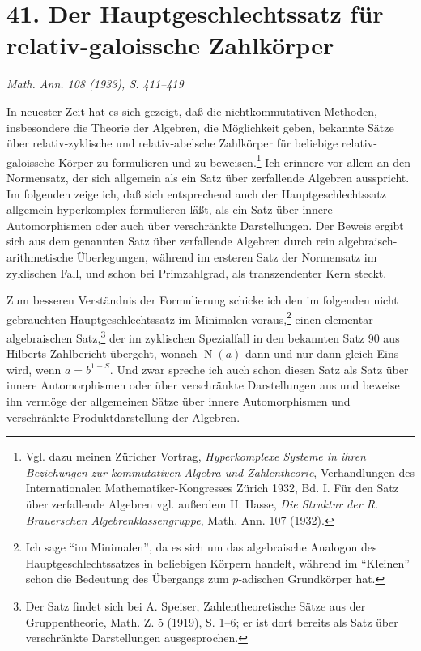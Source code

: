 \documentclass[11pt]{article}
\providecommand{\Norm}{\operatorname{N}}
\begin{document}
\clearpage

\section*{41. Der Hauptgeschlechtssatz für relativ-galoissche Zahlkörper}

\begin{center}
\emph{Math. Ann. 108 (1933), S. 411--419}
\end{center}

In neuester Zeit hat es sich gezeigt, daß die nichtkommutativen Methoden, insbesondere die Theorie der Algebren, die Möglichkeit geben, bekannte Sätze über relativ-zyklische und relativ-abelsche Zahlkörper für beliebige relativ-galoissche Körper zu formulieren und zu beweisen.\footnote{Vgl. dazu meinen Züricher Vortrag, \emph{Hyperkomplexe Systeme in ihren Beziehungen zur kommutativen Algebra und Zahlentheorie}, Verhandlungen des Internationalen Mathematiker-Kongresses Zürich 1932, Bd. I. Für den Satz über zerfallende Algebren vgl. außerdem H. Hasse, \emph{Die Struktur der R. Brauerschen Algebrenklassengruppe}, Math. Ann. 107 (1932).} Ich erinnere vor allem an den Normensatz, der sich allgemein als ein Satz über zerfallende Algebren ausspricht. Im folgenden zeige ich, daß sich entsprechend auch der Hauptgeschlechtssatz allgemein hyperkomplex formulieren läßt, als ein Satz über innere Automorphismen oder auch über verschränkte Darstellungen. Der Beweis ergibt sich aus dem genannten Satz über zerfallende Algebren durch rein algebraisch-arithmetische Überlegungen, während im ersteren Satz der Normensatz im zyklischen Fall, und schon bei Primzahlgrad, als transzendenter Kern steckt.

Zum besseren Verständnis der Formulierung schicke ich den im folgenden nicht gebrauchten Hauptgeschlechtssatz im Minimalen voraus,\footnote{Ich sage ``im Minimalen'', da es sich um das algebraische Analogon des Hauptgeschlechtssatzes in beliebigen Körpern handelt, während im ``Kleinen'' schon die Bedeutung des Übergangs zum \(p\)-adischen Grundkörper hat.} einen elementar-algebraischen Satz,\footnote{Der Satz findet sich bei A. Speiser, Zahlentheoretische Sätze aus der Gruppentheorie, Math. Z. 5 (1919), S. 1--6; er ist dort bereits als Satz über verschränkte Darstellungen ausgesprochen.} der im zyklischen Spezialfall in den bekannten Satz 90 aus Hilberts Zahlbericht übergeht, wonach \(\Norm(a)\) dann und nur dann gleich Eins wird, wenn \(a=b^{1-S}\). Und zwar spreche ich auch schon diesen Satz als Satz über innere Automorphismen oder über verschränkte Darstellungen aus und beweise ihn vermöge der allgemeinen Sätze über innere Automorphismen und verschränkte Produktdarstellung der Algebren.
\end{document}
